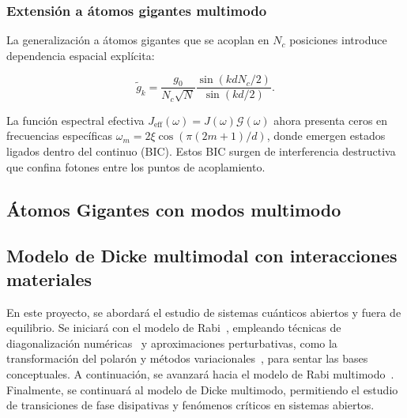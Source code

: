 \documentclass[onecolumn,notitlepage,letterpaper,aps,pra,12pt]{article}
\numberwithin{equation}{section}
\begin{document}
\subsubsection{Extensión a átomos gigantes multimodo}

La generalización a átomos gigantes que se acoplan en $N_c$ posiciones introduce dependencia espacial explícita:

\[\tilde{g}_k = \frac{g_0}{N_c\sqrt{N}} \frac{\sin(kdN_c/2)}{\sin(kd/2)}.\]

La función espectral efectiva $J_{\text{eff}}(\omega) = J(\omega) \mathcal{G}(\omega)$ ahora presenta ceros en frecuencias específicas $\omega_m = 2\xi\cos(\pi(2m+1)/d)$, donde emergen estados ligados dentro del continuo (BIC). Estos BIC surgen de interferencia destructiva que confina fotones entre los puntos de acoplamiento.




\clearpage

\subsection{Átomos Gigantes con modos multimodo}%


\subsection{Modelo de Dicke multimodal con interacciones materiales}%










En este proyecto, se abordará el estudio de sistemas cuánticos abiertos y fuera de equilibrio. Se iniciará con el modelo de Rabi~\cite{rabi1936}, empleando técnicas  de diagonalización numéricas~\cite{irish2007} y aproximaciones perturbativas, como la transformación del polarón y métodos variacionales~\cite{gonzalez2021}, para sentar las bases conceptuales. A continuación, se avanzará hacia el modelo de Rabi multimodo~\cite{peng2021}. Finalmente, se continuará al modelo de Dicke multimodo, permitiendo el estudio de transiciones de fase disipativas y fenómenos críticos en sistemas abiertos. 
\end{document}

